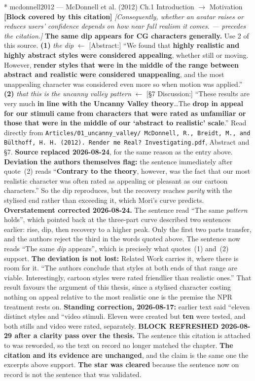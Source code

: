 \documentclass[11pt, a4paper]{article}
\makeatletter
\newcounter{citentry}
\newcommand{\citentry@core}[7]{%
  \stepcounter{citentry}
  \begingroup
  \sbox{\citentry@measurebox}{%
    \begin{minipage}{\linewidth}
      \noindent\colorbox{konstanzblue}{\parbox{\dimexpr\linewidth-2\fboxsep}{%
        \vspace{3pt}
        \textbf{\#\thecitentry \quad #2} \hfill \textit{#3}
        \vspace{3pt}
      }}
      \vspace{3pt}
      \noindent\begin{tabular}{@{}p{2.7cm} p{\dimexpr\linewidth-3cm}@{}}
        \textit{\small Sentence in thesis:} & #4 \\[5pt]
        \textbf{Usage:}\hfill       & #5 \\[5pt]
        \textit{\small Original source:}     & #6 \\[5pt]
        \textbf{How to check:}             & #7 \\
      \end{tabular}
      \vspace{5pt}
      \rule{10pt}{10pt}\quad \textbf{Validated} --- I have read the original and agree it supports the sentence.
    \end{minipage}%
  }%
  \Needspace{\dimexpr\ht\citentry@measurebox+\dp\citentry@measurebox\relax}%
  \endgroup
  \vspace{10pt}
  \noindent\colorbox{konstanzblue}{\parbox{\dimexpr\linewidth-2\fboxsep}{%
    \vspace{3pt}
    \textcolor{white}{\textbf{\#\thecitentry \quad #2}} \hfill \textcolor{white}{\textit{#3}}
    \vspace{3pt}
  }}
  \vspace{3pt}
  \noindent\begin{tabular}{@{}p{2.7cm} p{\dimexpr\linewidth-3cm}@{}}
    \textit{\small Sentence in thesis:} & \textcolor{darkgreen}{#4} \\[5pt]
    \textbf{Usage:}\hfill       & #5 \\[5pt]
    \textit{\small Original source:}     & \textcolor{darkred}{#6} \\[5pt]
    \textbf{How to check:}             & #7 \\
  \end{tabular}
  \vspace{5pt}
  \noindent\CheckBox[name=verified\thecitentry, width=10pt, height=10pt, bordercolor={0 0 0}, borderwidth=0.75, backgroundcolor={1 1 1}#1]{}\quad \textbf{Validated} --- I have read the original and agree it supports the sentence.
  \vspace{3pt}
  \noindent\textcolor{midgray}{\rule{\linewidth}{0.4pt}}
}
\newcommand{\citentry}{\@ifstar{\citentry@core{, checked}}{\citentry@core{}}}
\makeatother
\begin{document}
\begin{Form}
\citentry*
  {mcdonnell2012 --- McDonnell et al. (2012)}
  {Ch.1 Introduction $\rightarrow$ Motivation}
  {\textbf{[Block covered by this citation]} \emph{[Consequently, whether an avatar raises or reduces users' confidence depends on how near full realism it comes. --- precedes the citation.]} \textbf{The same dip appears for CG characters generally.}}
  {Use 2 of this source.}
  {\textbf{(1)} \emph{the dip} $\leftarrow$ [Abstract:] ``We found that \textbf{highly realistic and highly abstract styles were considered appealing}, whether still or moving. However, \textbf{render styles that were in the middle of the range between abstract and realistic were considered unappealing}, and the most unappealing character was considered even more so when motion was applied.'' \quad \textbf{(2)} \emph{that this is the uncanny valley pattern} $\leftarrow$ [\S7 Discussion:] ``These results are very much \textbf{in line with the Uncanny Valley theory}\ldots The \textbf{drop in appeal for our stimuli came from characters that were rated as unfamiliar or those that were in the middle of our `abstract to realistic' scale}.''}
  {Read directly from \texttt{\footnotesize Articles/01\_uncanny\_valley/ McDonnell, R., Breidt, M., and B\"ulthoff, H. H. (2012). Render me Real? Investigating.pdf}, Abstract and \S7. \textbf{Source replaced 2026-08-24}, for the same reason as the entry above. \textbf{Deviation the authors themselves flag:} the sentence immediately after quote~(2) reads ``\textbf{Contrary to the theory}, however, was the fact that our most realistic character was often rated as appealing or pleasant as our cartoon characters.'' So the dip reproduces, but the recovery reaches \emph{parity} with the stylised end rather than exceeding it, which Mori's curve predicts. \textbf{Overstatement corrected 2026-08-24.} The sentence read ``The same \emph{pattern} holds'', which pointed back at the three-part curve described two sentences earlier: rise, dip, then recovery to a higher peak. Only the first two parts transfer, and the authors reject the third in the words quoted above. The sentence now reads ``The same \emph{dip} appears'', which is precisely what quotes~(1) and~(2) support. \textbf{The deviation is not lost:} Related Work carries it, where there is room for it. ``The authors conclude that styles at both ends of that range are viable. Interestingly, cartoon styles were rated friendlier than realistic ones.'' That result favours the argument of this thesis, since a stylised character costing nothing on appeal relative to the most realistic one is the premise the NPR treatment rests on. \textbf{Standing correction, 2026-08-17:} earlier text said ``eleven distinct styles and ``video stimuli. Eleven were created but \textbf{ten} were tested, and both stills and video were rated, separately. \textbf{BLOCK REFRESHED 2026-08-29 after a clarity pass over the thesis.} The sentence this citation is attached to was reworded, so the text on record no longer matched the chapter. \textbf{The citation and its evidence are unchanged}, and the claim is the same one the excerpts above support. \textbf{The star was cleared} because the sentence now on record is not the sentence that was validated.}



\end{Form}
\end{document}
